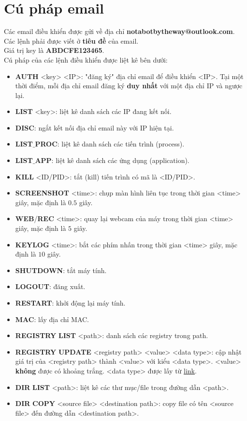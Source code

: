 \section{Cú pháp email}
Các email điều khiển được gửi về địa chỉ \textbf{notabotbytheway@outlook.com}.\\ 
Các lệnh phải được viết ở \textbf{tiêu đề} của email.\\
Giá trị key là \textbf{ABDCFE123465}.\\
Cú pháp của các lệnh điều khiển được liệt kê bên dưới:
\begin{itemize}
\item \textbf{AUTH} <key> <IP>: "đăng ký" địa chỉ email để điều khiển <IP>. Tại một thời điểm, mỗi địa chỉ email đăng ký \textbf{duy nhất} với một địa chỉ IP và ngược lại.
\item \textbf{LIST} <key>: liệt kê danh sách các IP đang kết nối.
\item \textbf{DISC}: ngắt kết nối địa chỉ email này với IP hiện tại.
\item \textbf{LIST}$\_$\textbf{PROC}: liệt kê danh sách các tiến trình (process).
\item \textbf{LIST}$\_$\textbf{APP}: liệt kê danh sách các ứng dụng (application).
\item \textbf{KILL} <ID/PID>: tắt (kill) tiến trình có mã là <ID/PID>.
\item \textbf{SCREENSHOT} <time>: chụp màn hình liên tục trong thời gian <time> giây, mặc định là $0.5$ giây.
\item \textbf{WEB}/\textbf{REC} <time>: quay lại webcam của máy trong thời gian <time> giây, mặc định là $5$ giây. 
\item \textbf{KEYLOG} <time>: bắt các phím nhấn trong thời gian <time> giây, mặc định là $10$ giây.
\item \textbf{SHUTDOWN}: tắt máy tính.
\item \textbf{LOGOUT}: đăng xuất. %
\item \textbf{RESTART}: khởi động lại máy tính.
\item \textbf{MAC}: lấy địa chỉ MAC.
\item \textbf{REGISTRY} \textbf{LIST} <path>: danh sách các registry trong path.
\item \textbf{REGISTRY} \textbf{UPDATE} <registry path> <value> <data type>: cập nhật giá trị của <registry path> thành <value> với kiểu <data type>. <value> \textbf{không} được có khoảng trắng. <data type> được lấy từ \href{https://docs.microsoft.com/en-us/windows/win32/sysinfo/registry-value-types}{link}.
\item \textbf{DIR} \textbf{LIST} <path>: liệt kê các thư mục/file trong đường dẫn <path>.
\item \textbf{DIR} \textbf{COPY} <source file> <destination path>: copy file có tên <source file> đến đường dẫn <destination path>.
\end{itemize}